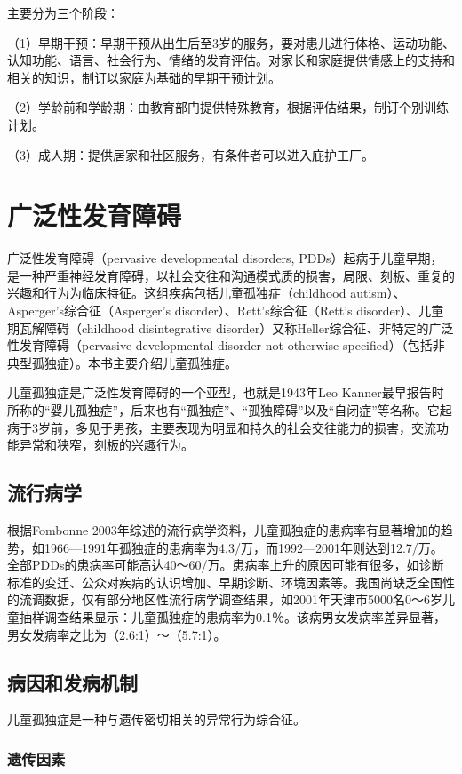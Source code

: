 主要分为三个阶段：

（1）早期干预：早期干预从出生后至3岁的服务，要对患儿进行体格、运动功能、认知功能、语言、社会行为、情绪的发育评估。对家长和家庭提供情感上的支持和相关的知识，制订以家庭为基础的早期干预计划。

（2）学龄前和学龄期：由教育部门提供特殊教育，根据评估结果，制订个别训练计划。

（3）成人期：提供居家和社区服务，有条件者可以进入庇护工厂。


\section{广泛性发育障碍}

广泛性发育障碍（pervasive developmental disorders,
PDDs）起病于儿童早期，是一种严重神经发育障碍，以社会交往和沟通模式质的损害，局限、刻板、重复的兴趣和行为为临床特征。这组疾病包括儿童孤独症（childhood
autism）、Asperger's综合征（Asperger's disorder）、Rett's综合征（Rett's
disorder）、儿童期瓦解障碍（childhood disintegrative
disorder）又称Heller综合征、非特定的广泛性发育障碍（pervasive
developmental disorder not otherwise
specified）（包括非典型孤独症）。本书主要介绍儿童孤独症。

儿童孤独症是广泛性发育障碍的一个亚型，也就是1943年Leo
Kanner最早报告时所称的“婴儿孤独症”，后来也有“孤独症”、“孤独障碍”以及“自闭症”等名称。它起病于3岁前，多见于男孩，主要表现为明显和持久的社会交往能力的损害，交流功能异常和狭窄，刻板的兴趣行为。

\subsection{流行病学}

根据Fombonne
2003年综述的流行病学资料，儿童孤独症的患病率有显著增加的趋势，如1966---1991年孤独症的患病率为4.3/万，而1992---2001年则达到12.7/万。全部PDDs的患病率可能高达40～60/万。患病率上升的原因可能有很多，如诊断标准的变迁、公众对疾病的认识增加、早期诊断、环境因素等。我国尚缺乏全国性的流调数据，仅有部分地区性流行病学调查结果，如2001年天津市5000名0～6岁儿童抽样调查结果显示：儿童孤独症的患病率为0.1％。该病男女发病率差异显著，男女发病率之比为（2.6:1）～（5.7:1）。

\subsection{病因和发病机制}

儿童孤独症是一种与遗传密切相关的异常行为综合征。

\subsubsection{遗传因素}

